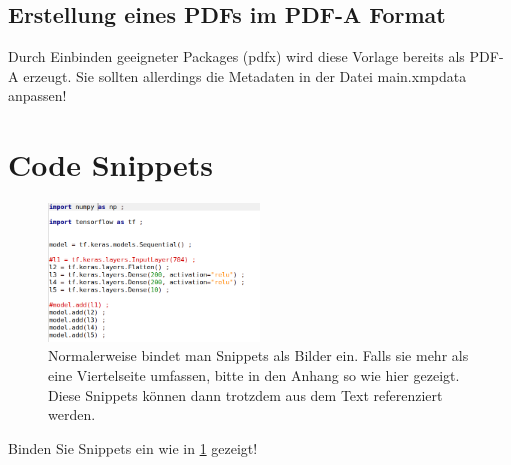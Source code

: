 \documentclass[12pt,oneside]{article}
\begin{document}
\subsection{Erstellung eines PDFs im PDF-A Format}
Durch Einbinden geeigneter Packages (pdfx) wird diese Vorlage bereits als PDF-A erzeugt. Sie sollten allerdings die Metadaten in der Datei main.xmpdata anpassen!

\section{Code Snippets}
\begin{figure}
    \centering
    \includegraphics[width=0.5\textwidth]{snippet.png}
    \caption{Normalerweise bindet man Snippets als Bilder ein. Falls sie mehr als eine Viertelseite umfassen, bitte in den Anhang so wie hier gezeigt. Diese Snippets können dann trotzdem aus dem Text referenziert werden.\label{Snippet}
    }
\end{figure}
Binden Sie Snippets ein wie in \ref{Snippet} gezeigt!
\end{document}

